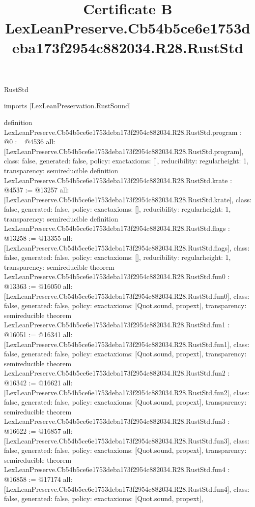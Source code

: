 \begin{lexlean}{RustStd}
\title{Certificate B LexLeanPreserve.Cb54b5ce6e1753deba173f2954c882034.R28.RustStd}
\begin{coremodule}
imports [LexLeanPreservation.RustSound]

definition LexLeanPreserve.Cb54b5ce6e1753deba173f2954c882034.R28.RustStd.program : @0 := @4536 {
  all: [LexLeanPreserve.Cb54b5ce6e1753deba173f2954c882034.R28.RustStd.program],
  class: false,
  generated: false,
  policy: exact{axioms: []},
  reducibility: regular{height: 1},
  transparency: semireducible
}
definition LexLeanPreserve.Cb54b5ce6e1753deba173f2954c882034.R28.RustStd.krate : @4537 := @13257 {
  all: [LexLeanPreserve.Cb54b5ce6e1753deba173f2954c882034.R28.RustStd.krate],
  class: false,
  generated: false,
  policy: exact{axioms: []},
  reducibility: regular{height: 1},
  transparency: semireducible
}
definition LexLeanPreserve.Cb54b5ce6e1753deba173f2954c882034.R28.RustStd.flags : @13258 := @13355 {
  all: [LexLeanPreserve.Cb54b5ce6e1753deba173f2954c882034.R28.RustStd.flags],
  class: false,
  generated: false,
  policy: exact{axioms: []},
  reducibility: regular{height: 1},
  transparency: semireducible
}
theorem LexLeanPreserve.Cb54b5ce6e1753deba173f2954c882034.R28.RustStd.fun0 : @13363 := @16050 {
  all: [LexLeanPreserve.Cb54b5ce6e1753deba173f2954c882034.R28.RustStd.fun0],
  class: false,
  generated: false,
  policy: exact{axioms: [Quot.sound, propext]},
  transparency: semireducible
}
theorem LexLeanPreserve.Cb54b5ce6e1753deba173f2954c882034.R28.RustStd.fun1 : @16051 := @16341 {
  all: [LexLeanPreserve.Cb54b5ce6e1753deba173f2954c882034.R28.RustStd.fun1],
  class: false,
  generated: false,
  policy: exact{axioms: [Quot.sound, propext]},
  transparency: semireducible
}
theorem LexLeanPreserve.Cb54b5ce6e1753deba173f2954c882034.R28.RustStd.fun2 : @16342 := @16621 {
  all: [LexLeanPreserve.Cb54b5ce6e1753deba173f2954c882034.R28.RustStd.fun2],
  class: false,
  generated: false,
  policy: exact{axioms: [Quot.sound, propext]},
  transparency: semireducible
}
theorem LexLeanPreserve.Cb54b5ce6e1753deba173f2954c882034.R28.RustStd.fun3 : @16622 := @16857 {
  all: [LexLeanPreserve.Cb54b5ce6e1753deba173f2954c882034.R28.RustStd.fun3],
  class: false,
  generated: false,
  policy: exact{axioms: [Quot.sound, propext]},
  transparency: semireducible
}
theorem LexLeanPreserve.Cb54b5ce6e1753deba173f2954c882034.R28.RustStd.fun4 : @16858 := @17174 {
  all: [LexLeanPreserve.Cb54b5ce6e1753deba173f2954c882034.R28.RustStd.fun4],
  class: false,
  generated: false,
  policy: exact{axioms: [Quot.sound, propext]},
}
\end{coremodule}
\end{lexlean}
